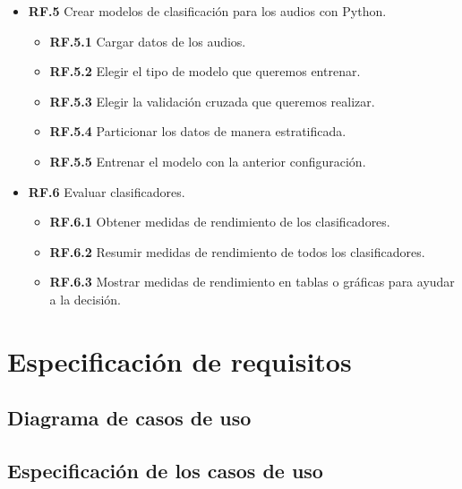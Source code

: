 \begin{itemize}
	\item \textbf{RF.5} Crear modelos de clasificación para los audios con Python.
	\begin{itemize}
	\item \textbf{RF.5.1} Cargar datos de los audios.
	\item \textbf{RF.5.2} Elegir el tipo de modelo que queremos entrenar.
	\item \textbf{RF.5.3} Elegir la validación cruzada que queremos realizar.
	\item \textbf{RF.5.4} Particionar los datos de manera estratificada.
	\item \textbf{RF.5.5} Entrenar el modelo con la anterior configuración.
	\end{itemize}
	
	\item \textbf{RF.6} Evaluar clasificadores.
	\begin{itemize}
	\item \textbf{RF.6.1} Obtener medidas de rendimiento de los clasificadores.
	\item \textbf{RF.6.2} Resumir medidas de rendimiento de todos los clasificadores.
	\item \textbf{RF.6.3} Mostrar medidas de rendimiento en tablas o gráficas para ayudar a la decisión.
	\end{itemize}
\end{itemize}

\section{Especificación de requisitos}
\subsection{Diagrama de casos de uso}



\subsection{Especificación de los casos de uso}

